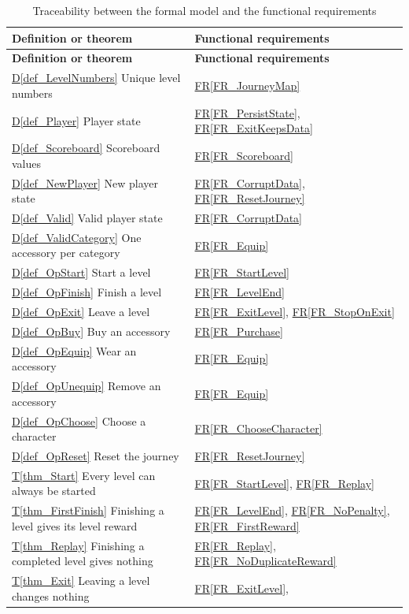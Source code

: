 \documentclass[12pt]{article}
\newcommand{\rref}[1]{\hyperref[#1]{FR\ref*{#1}}}
\newcommand{\thmref}[1]{\hyperref[#1]{T\ref*{#1}}}
\newcommand{\defref}[1]{\hyperref[#1]{D\ref*{#1}}}
\begin{document}
\begin{longtable}{>{\raggedright\arraybackslash}p{}>{\raggedright\arraybackslash}p{}}
\caption{Traceability between the formal model and the functional
requirements}
\label{tab:FormalTrace}\\
\toprule
\textbf{Definition or theorem} & \textbf{Functional requirements}\\
\midrule
\endfirsthead
\toprule
\textbf{Definition or theorem} & \textbf{Functional requirements}\\
\midrule
\endhead
\defref{def_LevelNumbers} Unique level numbers & \rref{FR_JourneyMap}\\
\defref{def_Player} Player state & \rref{FR_PersistState},
  \rref{FR_ExitKeepsData}\\
\defref{def_Scoreboard} Scoreboard values & \rref{FR_Scoreboard}\\
\defref{def_NewPlayer} New player state & \rref{FR_CorruptData},
  \rref{FR_ResetJourney}\\
\defref{def_Valid} Valid player state & \rref{FR_CorruptData}\\
\defref{def_ValidCategory} One accessory per category & \rref{FR_Equip}\\
\defref{def_OpStart} Start a level & \rref{FR_StartLevel}\\
\defref{def_OpFinish} Finish a level & \rref{FR_LevelEnd}\\
\defref{def_OpExit} Leave a level & \rref{FR_ExitLevel}, \rref{FR_StopOnExit}\\
\defref{def_OpBuy} Buy an accessory & \rref{FR_Purchase}\\
\defref{def_OpEquip} Wear an accessory & \rref{FR_Equip}\\
\defref{def_OpUnequip} Remove an accessory & \rref{FR_Equip}\\
\defref{def_OpChoose} Choose a character & \rref{FR_ChooseCharacter}\\
\defref{def_OpReset} Reset the journey & \rref{FR_ResetJourney}\\
\midrule
\thmref{thm_Start} Every level can always be started & \rref{FR_StartLevel},
  \rref{FR_Replay}\\
\thmref{thm_FirstFinish} Finishing a level gives its level reward &
  \rref{FR_LevelEnd}, \rref{FR_NoPenalty}, \rref{FR_FirstReward}\\
\thmref{thm_Replay} Finishing a completed level gives nothing &
  \rref{FR_Replay}, \rref{FR_NoDuplicateReward}\\
\thmref{thm_Exit} Leaving a level changes nothing & \rref{FR_ExitLevel},

\end{longtable}
\end{document}
